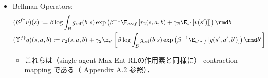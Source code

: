 \documentclass[a4paper,10pt,dvipdfmx]{jsarticle}
\begin{document}
\begin{itemize}
\begin{itemize}
\begin{align}
        \end{align}
        \item このとき，Bellman expectation equation より，
        \begin{align}
            Q_2^{f\dag}(s,a,b)&=r_2(s,a,b)+\gamma_2\E_{s'}\E_{a\sim f,b\sim g_f^*}\left[Q_2^{f\dag}(s',a',b')+\beta\mathcal{H}_{g_{\mathrm{ref}}}^{g_f}(s')\right]\\
            &=r_2(s,a,b)+\gamma_2\E_{s'}\left[\beta\log Z^{f\dag}(s')\right]\\
            &\implies V_2^{f\dag}(s)=\beta\log Z^{f\dag}(s)\\
            &\therefore V_2^{f\dag}(s)=\beta\log\int_{\mathcal{B}}g_{\mathrm{ref}}(b|s)\exp\left(\beta^{-1}\E_{a\sim f}\left[Q_2^{f\dag}(s,a,b)\right]\right)\rmd b
        \end{align}
        \item 以上をまとめると，以下が成り立つ：
        \begin{align}
            &V_2^{f\dag}(s)=\beta\log\int_{\mathcal{B}}g_{\mathrm{ref}}(b|s)\exp\left(\beta^{-1}\E_{a\sim f}\left[Q_2^{f\dag}(s,a,b)\right]\right)\rmd b\\
            &Q_2^{f\dag}(s,a,b)=r_2(s,a,b)+\gamma_2\E_{s'}\left[V_2^{f\dag}(s')\right]\\
            &g_f^*(b|s)=g_{\mathrm{ref}}(b|s)\exp\left(\beta^{-1}\left(\E_{a\sim f}\left[Q_2^{f\dag}(s,a,b)\right]-V_2^{f\dag}(s)\right)\right)
        \end{align}
        \item もしくは以下のように書ける：
        \begin{align}
            &V_2^{f\dag}(s)=\beta\log\int_{\mathcal{B}}\exp\left(\beta^{-1}\E_{a\sim f}\left[Q_2^{f\dag}(s,a,b)\right]+\log g_{\mathrm{ref}}(b|s)\right)\rmd b\label{eq:c_54}\\
            &Q_2^{f\dag}(s,a,b)=r_2(s,a,b)+\gamma_2\E_{s'}\left[V_2^{f\dag}(s')\right]\label{eq:c_55}\\
            &g_f^*(b|s)=\exp\left(\beta^{-1}\left(\E_{a\sim f}\left[Q_2^{f\dag}(s,a,b)\right]-V_2^{f\dag}(s)\right)+\log g_{\mathrm{ref}}(b|s)\right)
        \end{align}
    \end{itemize}
    \item Bellman Operators:
    \begin{align}
        &(\mathcal{B}^{f\dag}v)(s):=\beta\log\int_{\mathcal{B}}g_{\mathrm{ref}}(b|s)\exp\left(\beta^{-1}\E_{a\sim f}\left[r_2(s,a,b)+\gamma_2\E_{s'}\left[v(s')\right]\right]\right)\rmd b\\
        &(\Upsilon^{f\dag}q)(s,a,b):=r_2(s,a,b)+\gamma_2\E_{s'}\left[\beta\log\int_{\mathcal{B}}g_{\mathrm{ref}}(b|s)\exp\left(\beta^{-1}\E_{a'\sim f}\left[q(s',a',b')\right]\right)\rmd b'\right]
    \end{align}
    \begin{itemize}
        \item これらは（single-agent Max-Ent RLの作用素と同様に） contraction mapping である（\cite{Haarnoja2017-nn} Appendix A.2 参照）．
    \end{itemize}
\end{itemize}
\end{document}

